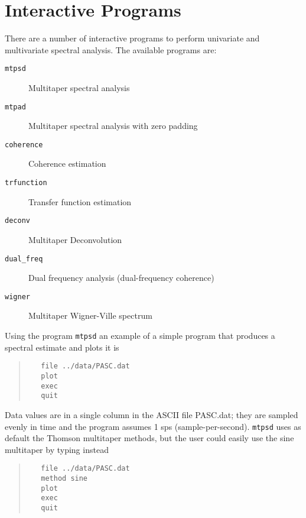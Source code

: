 \documentclass{article}
\begin{document}
\section{Interactive Programs}
There are a number of interactive programs to perform univariate and multivariate spectral analysis. The available programs are:
\begin{description}
\item[\texttt{mtpsd} ] Multitaper spectral analysis
\item[\texttt{mtpad} ] Multitaper spectral analysis with zero padding
\item[\texttt{coherence} ] Coherence estimation
\item[\texttt{trfunction} ] Transfer function estimation
\item[\texttt{deconv} ] Multitaper Deconvolution
\item[\texttt{dual\_freq} ] Dual frequency analysis (dual-frequency coherence)
\item[\texttt{wigner} ] Multitaper Wigner-Ville spectrum
\end{description}

Using the program \texttt{mtpsd} an example of a simple program that produces a spectral estimate and plots it is
\begin{quote}
\begin{verbatim}
   file ../data/PASC.dat
   plot
   exec
   quit
\end{verbatim}
\end{quote}
Data values are in a single column in the ASCII file PASC.dat; they are sampled evenly in time and the program assumes 1 sps (sample-per-second). \texttt{mtpsd} uses as default the Thomson multitaper methods, but the user could easily use the sine multitaper by typing instead
\begin{quote}
\begin{verbatim}
   file ../data/PASC.dat
   method sine
   plot
   exec
   quit
\end{verbatim}
\end{quote}
\end{document}
